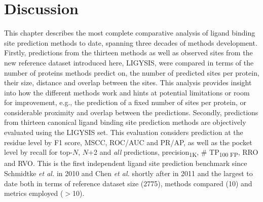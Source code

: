 \begin{longtable}[c]{|c|c|c|c|c|}
\label{tab:residue_level_benchmark}\\
\end{longtable}

\section{Discussion}

This chapter describes the most complete comparative analysis of ligand binding site prediction methods to date, spanning three decades of methods development. Firstly, predictions from the thirteen methods as well as observed sites from the new reference dataset introduced here, LIGYSIS, were compared in terms of the number of proteins methods predict on, the number of predicted sites per protein, their size, distance and overlap between the sites. This analysis provides insight into how the different methods work and hints at potential limitations or room for improvement, e.g., the prediction of a fixed number of sites per protein, or considerable proximity and overlap between the predictions. Secondly, predictions from thirteen canonical ligand binding site prediction methods are objectively evaluated using the LIGYSIS set. This evaluation considers prediction at the residue level by F1 score, MSCC, ROC/AUC and PR/AP, as well as the pocket level by recall for top-$N$, $N$+2 and \textit{all} predictions, precision\textsubscript{1K}, \# TP\textsubscript{100 FP}, RRO and RVO. This is the first independent ligand site prediction benchmark since Schmidtke \textit{et al.} \cite{SCHMIDTKE_2010_BENCHMARK} in 2010 and Chen \textit{et al.} \cite{CHEN_2011_ASSESSMENT} shortly after in 2011 and the largest to date both in terms of reference dataset size (2775), methods compared (10) and metrics employed ($>$10).

